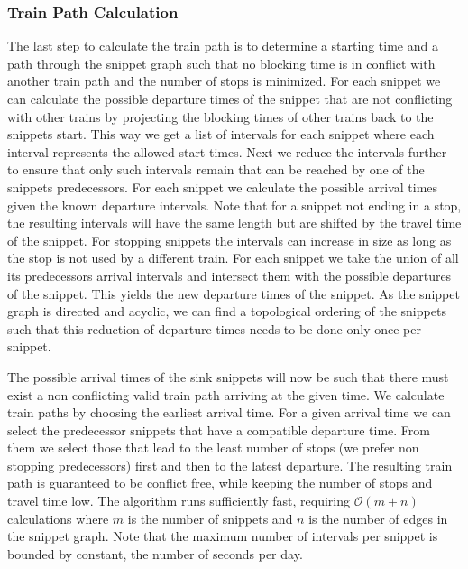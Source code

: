 \subsubsection{Train Path Calculation}
%
The last step to calculate the train path is to determine a starting time and a path through the snippet graph such that no blocking time is in conflict with another train path and the number of stops is minimized. For each snippet we can calculate the possible departure times of the snippet that are not conflicting with other trains by projecting the blocking times of other trains back to the snippets start. This way we get a list of intervals for each snippet where each interval represents the allowed start times. Next we reduce the intervals further to ensure that only such intervals remain that can be reached by one of the snippets predecessors. For each snippet we calculate the possible arrival times given the known departure intervals. Note that for a snippet not ending in a stop, the resulting intervals will have the same length but are shifted by the travel time of the snippet. For stopping snippets the intervals can increase in size as long as the stop is not used by a different train. For each snippet we take the union of all its predecessors arrival intervals and intersect them with the possible departures of the snippet. This yields the new departure times of the snippet. As the snippet graph is directed and acyclic, we can find a topological ordering of the snippets such that this reduction of departure times needs to be done only once per snippet.

The possible arrival times of the sink snippets will now be such that there must exist a non conflicting valid train path arriving at the given time. We calculate train paths by choosing the earliest arrival time. For a given arrival time we can select the predecessor snippets that have a compatible departure time. From them we select those that lead to the least number of stops (we prefer non stopping predecessors) first and then to the latest departure. The resulting train path is guaranteed to be conflict free, while keeping the number of stops and travel time low. The algorithm runs sufficiently fast, requiring $\mathcal{O}(m+n)$ calculations where $m$ is the number of snippets and $n$ is the number of edges in the snippet graph. Note that the maximum number of intervals per snippet is bounded by constant, the number of seconds per day.

